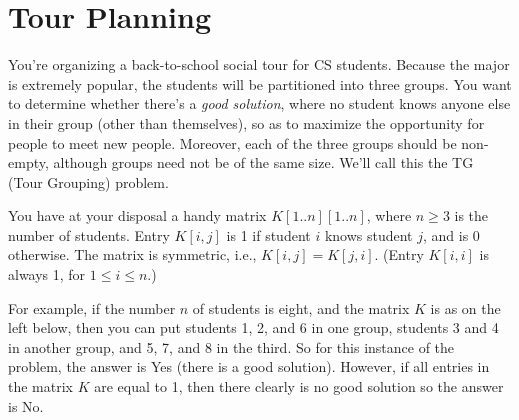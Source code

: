 \documentclass[11pt,fleqn]{exam}
\begin{document}
\clearpage

\section{Tour Planning}

You're organizing a back-to-school social tour for CS students. Because the major is extremely popular, the students will be partitioned into three groups. You want to determine whether there's a {\em good solution}, where no student knows anyone else in their group (other than themselves), so as to maximize the opportunity for people to meet new people. Moreover, each of the three groups should be non-empty, although groups need not be of the same size. We'll call this the TG (Tour Grouping) problem.

You have at your disposal a handy matrix $K[1..n][1..n]$, where $n\ge 3$ is the number of students. Entry $K[i,j]$ is 1 if student $i$ knows student $j$, and is 0 otherwise. The matrix is symmetric, i.e., $K[i,j] = K[j,i]$. (Entry $K[i,i]$ is always 1, for $1 \le i \le n$.)

For example, if the number $n$ of students is eight, and the matrix $K$ is as on the left below, then you can put students 1, 2, and 6 in one group, students 3 and 4 in another group, and 5, 7, and 8 in the third. So for this instance of the problem, the answer is Yes (there is a good solution). However, if all entries in the matrix $K$ are equal to 1, then there clearly is no good solution so the answer is No.
\end{document}

